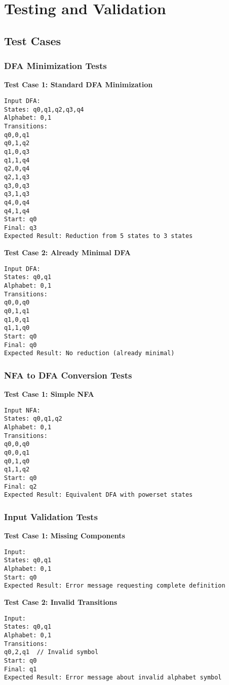 \documentclass[12pt]{article}
\begin{document}
\section{Testing and Validation}

\subsection{Test Cases}

\subsubsection{DFA Minimization Tests}
\textbf{Test Case 1: Standard DFA Minimization}
\begin{lstlisting}
Input DFA:
States: q0,q1,q2,q3,q4
Alphabet: 0,1
Transitions:
q0,0,q1
q0,1,q2
q1,0,q3
q1,1,q4
q2,0,q4
q2,1,q3
q3,0,q3
q3,1,q3
q4,0,q4
q4,1,q4
Start: q0
Final: q3
Expected Result: Reduction from 5 states to 3 states
\end{lstlisting}

\textbf{Test Case 2: Already Minimal DFA}
\begin{lstlisting}
Input DFA:
States: q0,q1
Alphabet: 0,1
Transitions:
q0,0,q0
q0,1,q1
q1,0,q1
q1,1,q0
Start: q0
Final: q0
Expected Result: No reduction (already minimal)
\end{lstlisting}

\subsubsection{NFA to DFA Conversion Tests}
\textbf{Test Case 1: Simple NFA}
\begin{lstlisting}
Input NFA:
States: q0,q1,q2
Alphabet: 0,1
Transitions:
q0,0,q0
q0,0,q1
q0,1,q0
q1,1,q2
Start: q0
Final: q2
Expected Result: Equivalent DFA with powerset states
\end{lstlisting}

\subsubsection{Input Validation Tests}
\textbf{Test Case 1: Missing Components}
\begin{lstlisting}
Input: 
States: q0,q1
Alphabet: 0,1
Start: q0
Expected Result: Error message requesting complete definition
\end{lstlisting}

\textbf{Test Case 2: Invalid Transitions}
\begin{lstlisting}
Input:
States: q0,q1
Alphabet: 0,1
Transitions:
q0,2,q1  // Invalid symbol
Start: q0
Final: q1
Expected Result: Error message about invalid alphabet symbol
\end{lstlisting}
\end{document}
